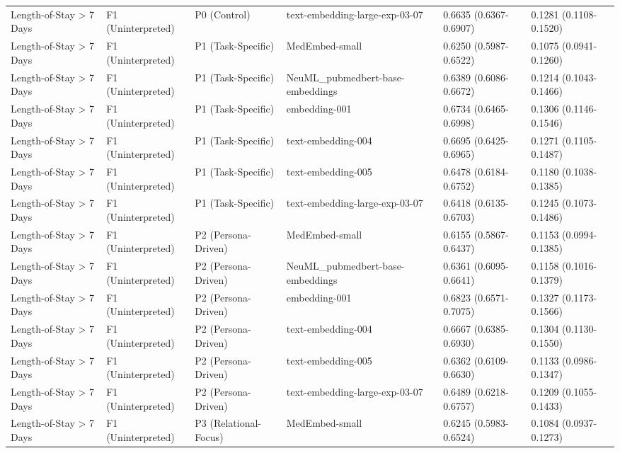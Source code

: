 \begin{tabular}{llllll}
Length-of-Stay \textgreater{} 7 Days & F1 (Uninterpreted) & P0 (Control) & text-embedding-large-exp-03-07 & 0.6635 (0.6367-0.6907) & 0.1281 (0.1108-0.1520) \\
Length-of-Stay \textgreater{} 7 Days & F1 (Uninterpreted) & P1 (Task-Specific) & MedEmbed-small & 0.6250 (0.5987-0.6522) & 0.1075 (0.0941-0.1260) \\
Length-of-Stay \textgreater{} 7 Days & F1 (Uninterpreted) & P1 (Task-Specific) & NeuML\_pubmedbert-base-embeddings & 0.6389 (0.6086-0.6672) & 0.1214 (0.1043-0.1466) \\
Length-of-Stay \textgreater{} 7 Days & F1 (Uninterpreted) & P1 (Task-Specific) & embedding-001 & 0.6734 (0.6465-0.6998) & 0.1306 (0.1146-0.1546) \\
Length-of-Stay \textgreater{} 7 Days & F1 (Uninterpreted) & P1 (Task-Specific) & text-embedding-004 & 0.6695 (0.6425-0.6965) & 0.1271 (0.1105-0.1487) \\
Length-of-Stay \textgreater{} 7 Days & F1 (Uninterpreted) & P1 (Task-Specific) & text-embedding-005 & 0.6478 (0.6184-0.6752) & 0.1180 (0.1038-0.1385) \\
Length-of-Stay \textgreater{} 7 Days & F1 (Uninterpreted) & P1 (Task-Specific) & text-embedding-large-exp-03-07 & 0.6418 (0.6135-0.6703) & 0.1245 (0.1073-0.1486) \\
Length-of-Stay \textgreater{} 7 Days & F1 (Uninterpreted) & P2 (Persona-Driven) & MedEmbed-small & 0.6155 (0.5867-0.6437) & 0.1153 (0.0994-0.1385) \\
Length-of-Stay \textgreater{} 7 Days & F1 (Uninterpreted) & P2 (Persona-Driven) & NeuML\_pubmedbert-base-embeddings & 0.6361 (0.6095-0.6641) & 0.1158 (0.1016-0.1379) \\
Length-of-Stay \textgreater{} 7 Days & F1 (Uninterpreted) & P2 (Persona-Driven) & embedding-001 & 0.6823 (0.6571-0.7075) & 0.1327 (0.1173-0.1566) \\
Length-of-Stay \textgreater{} 7 Days & F1 (Uninterpreted) & P2 (Persona-Driven) & text-embedding-004 & 0.6667 (0.6385-0.6930) & 0.1304 (0.1130-0.1550) \\
Length-of-Stay \textgreater{} 7 Days & F1 (Uninterpreted) & P2 (Persona-Driven) & text-embedding-005 & 0.6362 (0.6109-0.6630) & 0.1133 (0.0986-0.1347) \\
Length-of-Stay \textgreater{} 7 Days & F1 (Uninterpreted) & P2 (Persona-Driven) & text-embedding-large-exp-03-07 & 0.6489 (0.6218-0.6757) & 0.1209 (0.1055-0.1433) \\
Length-of-Stay \textgreater{} 7 Days & F1 (Uninterpreted) & P3 (Relational-Focus) & MedEmbed-small & 0.6245 (0.5983-0.6524) & 0.1084 (0.0937-0.1273) \\

\end{tabular}

